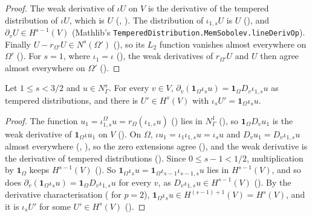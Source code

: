 \begin{proof}
\leanok
The weak derivative of $\iota U$ on $V$ is the derivative of the tempered distribution of
$\iota U$, which is $U$ (, ). The
distribution of $\iota_{1,s} U$ is $U$ (), and
$\partial_v U \in H^{s-1}(V)$ (Mathlib's
\texttt{TemperedDistribution.\allowbreak MemSobolev.\allowbreak lineDerivOp}). Finally
$U - r_{\Omega'} U \in N^s(\Omega')$ (), so its $L_2$
function vanishes almost everywhere on $\Omega'$ (). For $s = 1$,
where $\iota_1 = \iota$ (), the weak derivatives of $r_{\Omega'} U$ and
$U$ then agree almost everywhere on $\Omega'$ ().
\end{proof}

\begin{lemma}
\label{lem:zero-extension-trace-kernel}
\leanok
{}
Let $1 \leq s < 3/2$ and $u \in N^s_\Gamma$. For every $v \in V$,
$\partial_v(\mathbf 1_\Omega \iota_s u) = \mathbf 1_\Omega D_v \iota_{1,s} u$ as tempered
distributions, and there is $U' \in H^s(V)$ with $\iota_s U' = \mathbf 1_\Omega \iota_s u$.
\end{lemma}

\begin{proof}
\leanok
The function $u_1 = \iota^\Omega_{1,s} u = r_\Omega(\iota_{1,s} u)$
() lies in $N^1_\Gamma$ (), so
$\mathbf 1_\Omega D_v u_1$ is the weak derivative of $\mathbf 1_\Omega \iota u_1$ on $V$
(). On
$\Omega$, $\iota u_1 = \iota_1 \iota_{1,s} u = \iota_s u$ and
$D_v u_1 = D_v \iota_{1,s} u$ almost everywhere
(, ), so the zero extensions agree
(), and the weak derivative is the derivative of tempered
distributions (). Since $0 \leq s - 1 < 1/2$, multiplication
by $\mathbf 1_\Omega$ keeps $H^{s-1}(V)$ (). So
$\mathbf 1_\Omega \iota_s u = \mathbf 1_\Omega \iota_{s-1} \iota_{s-1,s} u$ lies in $H^{s-1}(V)$,
and so does $\partial_v(\mathbf 1_\Omega \iota_s u) = \mathbf 1_\Omega D_v \iota_{1,s} u$
for every $v$, as $D_v \iota_{1,s} u \in H^{s-1}(V)$
(). By the derivative characterisation
( for $p = 2$),
$\mathbf 1_\Omega \iota_s u \in H^{(s-1)+1}(V) = H^s(V)$, and it is $\iota_s U'$ for some
$U' \in H^s(V)$ ().
\end{proof}


